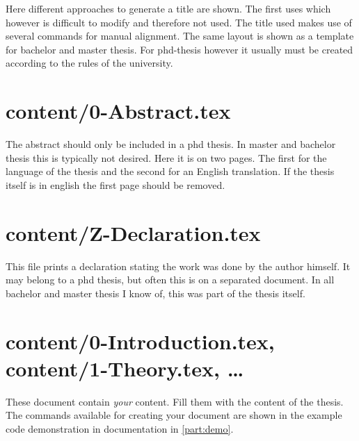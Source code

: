 Here different approaches to generate a title are shown. The first uses  which however is difficult to modify and therefore not used. The title used makes use of several  commands for manual alignment. The same layout is shown as a template for bachelor and master thesis. For phd-thesis however it usually must be created according to the rules of the university.


\section{content/0-Abstract.tex}

The abstract should only be included in a phd thesis. In master and bachelor thesis this is typically not desired. Here it is on two pages. The first for the language of the thesis and the second for an English translation.
If the thesis itself is in english the first page should be removed.


\section{content/Z-Declaration.tex}

This file prints a declaration stating the work was done by the author himself.
It may belong to a phd thesis, but often this is on a separated document. In all bachelor and master thesis I know of, this was part of the thesis itself.



\section{content/0-Introduction.tex, content/1-Theory.tex, \ldots}

These document contain \emph{your} content. Fill them with the content of the thesis. The commands available for creating your document are shown in the example code demonstration in documentation in \cref{part:demo}.

